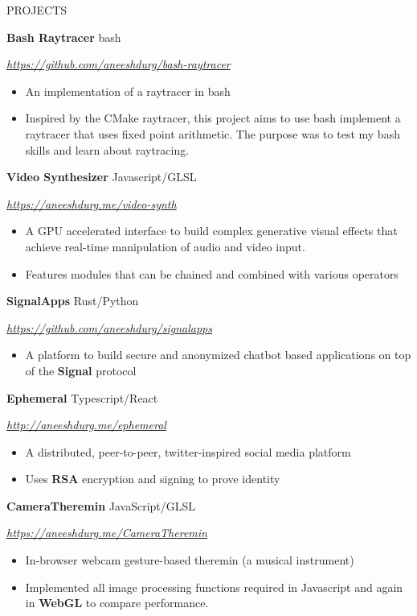 \documentclass[paper=a4,fontsize=11pt]{scrartcl} %
\newcommand{\sepspace}{\vspace*{1em}}		%
\newcommand{\NewPart}[1]{ \noindent \large \usefont{OT1}{phv}{b}{n}\uppercase{#1} \normalfont \normalsize}
\newcommand{\EducationEntry}[4]{
		\noindent \textbf{#1}     %
			\hfill#2 \par  %
		\noindent \textit{#3} \par        %
		\noindent\hangafter=0 \small #4 %
		\normalsize \par}
\begin{document}
\sepspace
\NewPart{Projects}{}
\newline
\EducationEntry{Bash Raytracer}{bash}{\url{https://github.com/aneeshdurg/bash-raytracer}}{
\begin{itemize}
\item An implementation of a raytracer in bash
\item Inspired by the CMake raytracer, this project aims to use bash implement a raytracer that uses fixed point arithmetic. The purpose was to test my bash skills and learn about raytracing.
\end{itemize}
}

\EducationEntry{Video Synthesizer}{Javascript/GLSL}{\url{https://aneeshdurg.me/video-synth}}{
\begin{itemize}
\item A GPU accelerated interface to build complex generative visual effects that achieve real-time manipulation of audio and video input.
\item Features modules that can be chained and combined with various operators
\end{itemize}
}

\EducationEntry{SignalApps}{Rust/Python}{\url{https://github.com/aneeshdurg/signalapps}} {
\begin{itemize}
  \item A platform to build secure and anonymized chatbot based applications on top of the \textbf{Signal} protocol
\end{itemize}

}

\EducationEntry{Ephemeral}{Typescript/React}{\url{http://aneeshdurg.me/ephemeral}}{
\begin{itemize}
\item A distributed, peer-to-peer, twitter-inspired social media platform
\item Uses \textbf{RSA} encryption and signing to prove identity
\end{itemize}
}

\EducationEntry{CameraTheremin}{JavaScript/GLSL}{\url{https://aneeshdurg.me/CameraTheremin}}{
\begin{itemize}
\item In-browser webcam gesture-based theremin (a musical instrument)
\item Implemented all image processing functions required in Javascript and again in \textbf{WebGL} to compare performance.
\end{itemize}
}
\end{document}
